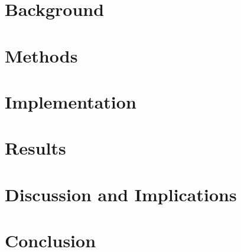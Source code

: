 

\clearpage


\chapter{Background}
\label{ch:background}




\chapter{Methods}
\label{ch:methods}




\chapter{Implementation}
\label{ch:Implementation}


%
\chapter{Results}
\label{ch:results}



\chapter{Discussion and Implications}
\label{ch:discussion}



\chapter{Conclusion}
\label{ch:conclusion}



\clearpage

